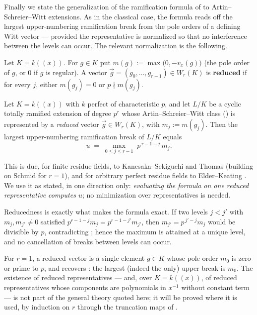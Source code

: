 Finally we state the generalization of the ramification formula of
 to Artin--Schreier--Witt extensions. As in
the classical case, the formula reads off the largest upper-numbering ramification
break from the pole orders of a defining Witt vector --- provided the representative
is normalized so that no interference between the levels can occur. The relevant
normalization is the following.

\begin{definition}\label{definition:reduced_witt_vector:reorg}
Let $K = k((x))$. For $g \in K$ put $m(g) := \max\bigl(0, -v_x(g)\bigr)$ (the pole
order of $g$, or $0$ if $g$ is regular). A vector
$\vec g = (g_0, \dots, g_{r-1}) \in W_r(K)$ is \textbf{reduced} if for every $j$,
either $m(g_j) = 0$ or $p \nmid m(g_j)$.
\end{definition}

\begin{theorem}\label{theorem:schmid_witt_break_formula:reorg}
Let $K = k((x))$ with $k$ perfect of characteristic $p$, and let $L/K$ be a cyclic
totally ramified extension of degree $p^r$ whose Artin--Schreier--Witt class
() is represented by a \emph{reduced} vector
$\vec g \in W_r(K)$, with $m_j := m(g_j)$. Then the largest upper-numbering
ramification break of $L/K$ equals
\[
u \;=\; \max_{0 \le j \le r-1} \; p^{\,r-1-j}\, m_j .
\]
\end{theorem}

This is due, for finite residue fields, to Kanesaka--Sekiguchi
\cite{KanesakaSekiguchi1979} and Thomas \cite{Thomas2005} (building on Schmid
\cite{Schmid1937} for $r = 1$), and for arbitrary perfect residue fields to
Elder--Keating \cite{ElderKeating2025}. We use it as stated, in one direction only:
\emph{evaluating the formula on one reduced representative computes $u$}; no
minimization over representatives is needed.

\begin{rem*}
Reducedness is exactly what makes the formula exact. If two levels $j < j'$ with
$m_j, m_{j'} \neq 0$ satisfied $p^{r-1-j} m_j = p^{r-1-j'} m_{j'}$, then
$m_{j'} = p^{\,j'-j} m_j$ would be divisible by $p$, contradicting
; hence the maximum is attained at a unique
level, and no cancellation of breaks between levels can occur.
\end{rem*}

\begin{rem*}
For $r = 1$, a reduced vector is a single element $g \in K$ whose pole order $m_0$ is
zero or prime to $p$, and  recovers
: the largest (indeed the only) upper break
is $m_0$. The existence of reduced representatives --- and, over $K = k((x))$, of
reduced representatives whose components are polynomials in $x^{-1}$ without constant
term --- is not part of the general theory quoted here; it will be proved where it is
used, by induction on $r$ through the truncation maps of
.
\end{rem*}


